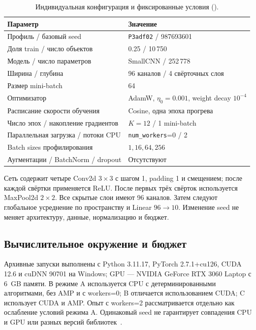 \begin{table}[H]
\centering\small
\caption{Индивидуальная конфигурация и фиксированные условия ().}\label{tab:config}
\begin{tabular}{@{}p{6.4cm}p{8.4cm}@{}}
\toprule Параметр & Значение \\\midrule
Профиль / базовый seed & \texttt{P3adf02} / 987693601 \\
Доля train / число объектов & 0.25 / 10\,750 \\
Модель / число параметров & SmallCNN / 252\,778 \\
Ширина / глубина & 96 каналов / 4 свёрточных слоя \\
Размер mini-batch & 64 \\
Оптимизатор & AdamW, $\eta_0=0.001$, weight decay $10^{-4}$ \\
Расписание скорости обучения & Cosine, одна эпоха прогрева \\
Число эпох / накопление градиентов & $K=12$ / 1 mini-batch \\
Параллельная загрузка / потоки CPU & \texttt{num\_workers}=0 / 2 \\
Batch sizes профилирования & $1,16,64,256$ \\
Аугментации / BatchNorm / dropout & Отсутствуют \\
\bottomrule
\end{tabular}
\end{table}

Сеть содержит четыре Conv2d $3\times3$ с шагом 1, padding 1 и смещением; после каждой свёртки применяется ReLU. После первых трёх свёрток используется MaxPool2d $2\times2$. Все скрытые слои имеют 96 каналов. Затем следуют глобальное усреднение по пространству и Linear $96\to10$. Изменение seed не меняет архитектуру, данные, нормализацию и бюджет.

\subsection{Вычислительное окружение и бюджет}
Архивные запуски выполнены с Python 3.11.17, PyTorch 2.7.1+cu126, CUDA 12.6 и cuDNN 90701 на Windows; GPU --- NVIDIA GeForce RTX 3060 Laptop с 6~GB памяти. В режиме A используется CPU с детерминированными алгоритмами, без AMP и с workers=0; B отличается использованием CUDA; C использует CUDA и AMP. Опыт с workers=2 рассматривается отдельно как ослабление условий режима A. Одинаковый seed не гарантирует совпадения CPU и GPU или разных версий библиотек~\cite{torch}.

